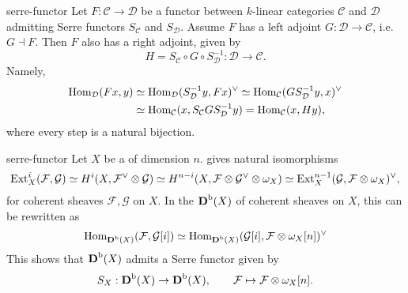 \begin{example}{serre-functor}
    Let $F : \mathcal{C} \to \mathcal{D}$ be a functor between $k$-linear categories $\mathcal{C}$ and $\mathcal{D}$ admitting Serre functors $S_\mathcal{C}$ and $S_\mathcal{D}$. Assume $F$ has a left adjoint $G : \mathcal{D} \to \mathcal{C}$, i.e. $G \dashv F$. Then $F$ also has a right adjoint, given by
    \[ H = S_\mathcal{C} \circ G \circ S_\mathcal{D}^{-1} : \mathcal{D} \to \mathcal{C} . \]
    Namely,
    \[ \begin{aligned} \text{Hom}_\mathcal{D}(Fx, y) &\simeq \text{Hom}_\mathcal{D}(S_\mathcal{D}^{-1} y, Fx)^\vee \simeq \text{Hom}_\mathcal{C}(G S_\mathcal{D}^{-1} y, x)^\vee \\ &\simeq \text{Hom}_\mathcal{C}(x, S_\mathcal{C} G S_\mathcal{D}^{-1} y) = \text{Hom}_\mathcal{C}(x, H y) , \end{aligned} \]
    where every step is a natural bijection.
\end{example}

\begin{example}{serre-functor}
    Let $X$ be a   of dimension $n$.  gives natural isomorphisms
    \[ \textup{Ext}_X^i(\mathcal{F}, \mathcal{G}) \simeq H^i(X, \mathcal{F}^\vee \otimes \mathcal{G}) \simeq H^{n - i}(X, \mathcal{F} \otimes \mathcal{G}^\vee \otimes \omega_X) \simeq \textup{Ext}_X^{n - 1}(\mathcal{G}, \mathcal{F} \otimes \omega_X)^\vee , \]
    for coherent sheaves $\mathcal{F}, \mathcal{G}$ on $X$. In the  $\textbf{D}^\textup{b}(X)$ of coherent sheaves on $X$, this can be rewritten as
    \[ \text{Hom}_{\textbf{D}^\textup{b}(X)}(\mathcal{F}, \mathcal{G}[i]) \simeq \text{Hom}_{\textbf{D}^\textup{b}(X)}(\mathcal{G}[i], \mathcal{F} \otimes \omega_X[n])^\vee \]
    This shows that $\textbf{D}^\textup{b}(X)$ admits a Serre functor given by
    \[ S_X : \textbf{D}^\textup{b}(X) \to \textbf{D}^\textup{b}(X), \qquad \mathcal{F} \mapsto \mathcal{F} \otimes \omega_X[n] . \]
\end{example}
